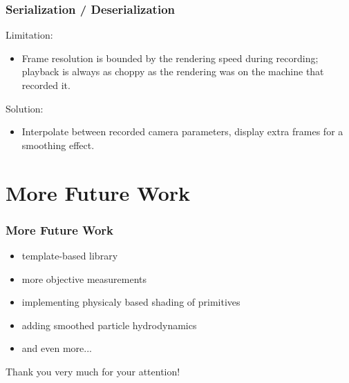 \documentclass[aspectratio=169]{beamer}
\begin{document}
  \begin{frame}
    \frametitle{Serialization / Deserialization}
    Limitation:
    \begin{itemize}
      \item Frame resolution is bounded by the rendering speed during recording; playback is always as choppy as the rendering was on the machine that recorded it.
    \end{itemize}
    \bigskip
    Solution:
    \begin{itemize}
      \item Interpolate between recorded camera parameters, display extra frames for a smoothing effect.
    \end{itemize}
  \end{frame}

  \section{More Future Work} %
  \label{sec:more_future_work}
  \begin{frame}
    \frametitle{More Future Work}
    \begin{itemize}
    \setlength\itemsep{1.1em}
      \item template-based library
      \item more objective measurements
      \item implementing physicaly based shading of primitives
      \item adding smoothed particle hydrodynamics
      \item and even more...
    \end{itemize}
  \end{frame}

  \begin{frame}
    \vfill
    \center
    Thank you very much for your attention!
    \vfill
  \end{frame}
\end{document}
